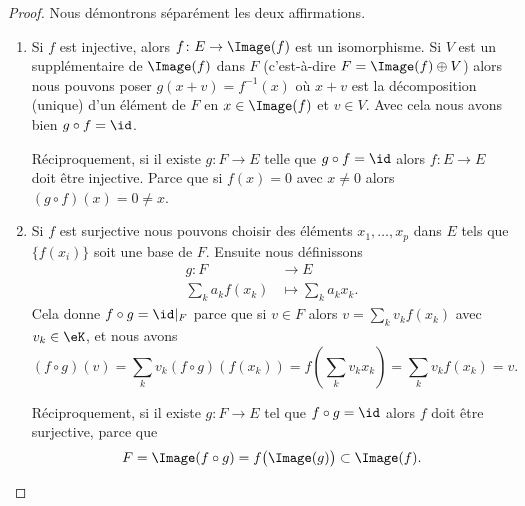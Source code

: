 \begin{proof}
	Nous démontrons séparément les deux affirmations.
	\begin{enumerate}
		\item
		      Si \( f\) est injective, alors \( f\colon E\to \Image(f)\) est un isomorphisme. Si \( V\) est un supplémentaire de \( \Image(f)\) dans \( F\) (c'est-à-dire \( F=\Image(f)\oplus V\)) alors nous pouvons poser \( g(x+v)=f^{-1}(x)\) où \( x+v\) est la décomposition (unique) d'un élément de \( F\) en \( x\in\Image(f)\) et \( v\in V\). Avec cela nous avons bien \( g\circ f=\id\).

		      Réciproquement, si il existe \( g\colon F\to E\) telle que \( g\circ f=\id\) alors \( f\colon E\to E\) doit être injective. Parce que si \( f(x)=0\) avec \( x\neq 0\) alors \( (g\circ f)(x)=0\neq x\).
		\item
		      Si \( f\) est surjective nous pouvons choisir des éléments \( x_1,\ldots, x_p\) dans \( E\) tels que \( \{ f(x_i) \}\) soit une base de \( F\). Ensuite nous définissons
		      \begin{equation}
			      \begin{aligned}
				      g\colon F         & \to E                   \\
				      \sum_k a_k f(x_k) & \mapsto \sum_k a_k x_k.
			      \end{aligned}
		      \end{equation}
		      Cela donne \(  f\circ g=\id|_F\) parce que si \( v\in F\) alors \( v=\sum_kv_kf(x_k)\) avec \( v_k\in \eK\), et nous avons
		      \begin{equation}
			      (f\circ g)(v)=\sum_k v_k (f\circ g) \left(f(x_k)\right)
			      =f\left( \sum_k v_k x_k \right)
			      =\sum_k v_k f(x_k) = v.
		      \end{equation}

		      Réciproquement, si il existe \( g\colon F\to E\) tel que \( f\circ g=\id\) alors \( f\) doit être surjective, parce que
		      \begin{equation}
			      F=\Image(f\circ g)=f\big( \Image(g) \big)\subset \Image(f).
		      \end{equation}
	\end{enumerate}
\end{proof}
